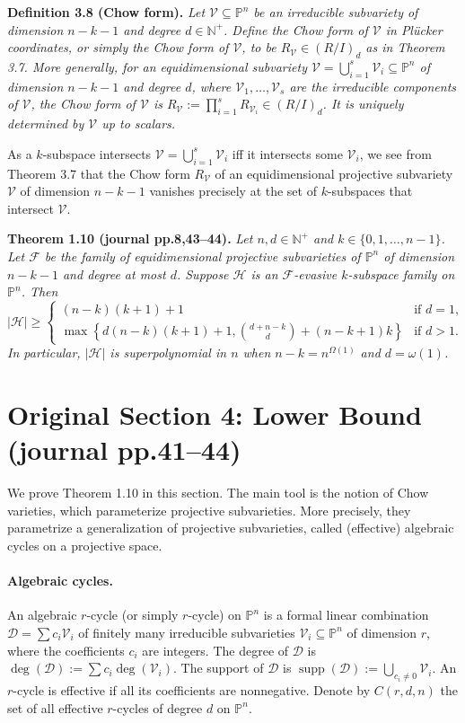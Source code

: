 \documentclass[10pt,a4paper]{article}
\newcommand{\PP}{\mathbb P}
\newcommand{\supp}{\operatorname{supp}}
\newenvironment{result}[1]{\par\medskip\noindent\textbf{#1.}\itshape}{\par\medskip}
\begin{document}
\begin{result}{Definition 3.8 (Chow form)}
Let $\mathcal V\subseteq\PP^n$ be an irreducible subvariety of dimension $n-k-1$ and degree $d\in\mathbb N^+$. Define the Chow form of $\mathcal V$ in Pl\"ucker coordinates, or simply the Chow form of $\mathcal V$, to be $R_{\mathcal V}\in(R/I)_d$ as in Theorem 3.7.
More generally, for an equidimensional subvariety $\mathcal V=\bigcup_{i=1}^s\mathcal V_i\subseteq\PP^n$ of dimension $n-k-1$ and degree $d$, where $\mathcal V_1,\ldots,\mathcal V_s$ are the irreducible components of $\mathcal V$, the Chow form of $\mathcal V$ is $R_{\mathcal V}:=\prod_{i=1}^sR_{\mathcal V_i}\in(R/I)_d$. It is uniquely determined by $\mathcal V$ up to scalars.
\end{result}
As a $k$-subspace intersects $\mathcal V=\bigcup_{i=1}^s\mathcal V_i$ iff it intersects some $\mathcal V_i$, we see from Theorem 3.7 that the Chow form $R_{\mathcal V}$ of an equidimensional projective subvariety $\mathcal V$ of dimension $n-k-1$ vanishes precisely at the set of $k$-subspaces that intersect $\mathcal V$.

\begin{result}{Theorem 1.10 (journal pp.8,43--44)}
Let $n,d\in\mathbb N^+$ and $k\in\{0,1,\ldots,n-1\}$. Let $\mathcal F$ be the family of equidimensional projective subvarieties of $\PP^n$ of dimension $n-k-1$ and degree at most $d$. Suppose $\mathcal H$ is an $\mathcal F$-evasive $k$-subspace family on $\PP^n$. Then
\[
|\mathcal H|\ge\begin{cases}
(n-k)(k+1)+1&\text{if }d=1,\\[2pt]
\max\left\{d(n-k)(k+1)+1,\binom{d+n-k}{d}+(n-k+1)k\right\}&\text{if }d>1.
\end{cases}
\]
In particular, $|\mathcal H|$ is superpolynomial in $n$ when $n-k=n^{\Omega(1)}$ and $d=\omega(1)$.
\end{result}

\section*{Original Section 4: Lower Bound (journal pp.41--44)}
We prove Theorem 1.10 in this section. The main tool is the notion of Chow varieties, which parameterize projective subvarieties. More precisely, they parametrize a generalization of projective subvarieties, called (effective) algebraic cycles on a projective space.
\paragraph{Algebraic cycles.}
An algebraic $r$-cycle (or simply $r$-cycle) on $\PP^n$ is a formal linear combination $\mathcal D=\sum c_i\mathcal V_i$ of finitely many irreducible subvarieties $\mathcal V_i\subseteq\PP^n$ of dimension $r$, where the coefficients $c_i$ are integers. The degree of $\mathcal D$ is $\deg(\mathcal D):=\sum c_i\deg(\mathcal V_i)$. The support of $\mathcal D$ is $\supp(\mathcal D):=\bigcup_{c_i\ne0}\mathcal V_i$. An $r$-cycle is effective if all its coefficients are nonnegative. Denote by $C(r,d,n)$ the set of all effective $r$-cycles of degree $d$ on $\PP^n$.
\end{document}
